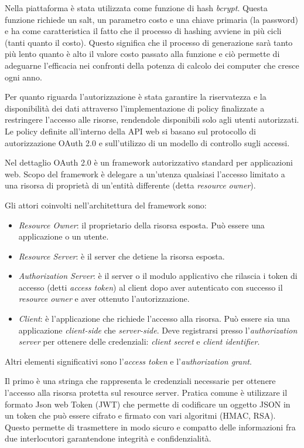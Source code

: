 Nella piattaforma è stata utilizzata come funzione di hash \textit{bcrypt}\cite{bcrypt}. Questa funzione richiede un salt, un parametro costo e una chiave primaria (la password) e ha come
caratteristica il fatto che il processo di hashing avviene in più cicli (tanti quanto il costo). Questo significa che il processo di generazione sarà tanto più lento quanto è alto il valore
costo passato alla funzione e ciò permette di adeguarne l'efficacia nei confronti della potenza di calcolo dei computer che cresce ogni anno.

Per quanto riguarda l'autorizzazione è stata garantire la riservatezza e la disponibilità dei dati
attraverso l'implementazione di policy finalizzate a restringere l'accesso alle risorse,
rendendole disponibili solo agli utenti autorizzati.
Le policy definite all'interno della API web si basano sul protocollo di autorizzazione OAuth 2.0 \cite{rfc6749} e sull'utilizzo di un
modello di controllo sugli accessi.

Nel dettaglio OAuth 2.0 è un framework autorizzativo standard per applicazioni web.
Scopo del framework è delegare a un'utenza qualsiasi l'accesso limitato a una risorsa di proprietà di un'entità differente (detta \textit{resource owner}).

Gli attori coinvolti nell'architettura del framework sono:
\begin{itemize}
    \itemsep0em
    \item \textit{Resource Owner}: il proprietario della risorsa esposta. Può essere una applicazione o un utente.
    \item \textit{Resource Server}: è il server che detiene la risorsa esposta.
    \item \textit{Authorization Server}: è il server o il modulo applicativo che rilascia i token di accesso (detti \textit{access token}) al client dopo aver
          autenticato con successo il \textit{resource owner} e aver ottenuto l'autorizzazione.
    \item  \textit{Client}: è l'applicazione che richiede l'accesso alla risorsa. Può essere sia una applicazione \textit{client-side} che \textit{server-side}.
          Deve registrarsi presso l'\textit{authorization server} per ottenere delle credenziali: \textit{client secret} e \textit{client identifier}.
\end{itemize}

Altri elementi significativi sono l'\textit{access token} e l'\textit{authorization grant}.

Il primo è una stringa che rappresenta le credenziali necessarie per ottenere l'accesso alla risorsa protetta sul resource server.
Pratica comune è utilizzare il formato Json web Token\cite{rfc7519} (JWT) che permette di codificare un oggetto JSON in un token
che può essere cifrato e firmato con vari algoritmi (HMAC, RSA). Questo permette di trasmettere in modo sicuro e compatto delle informazioni
fra due interlocutori garantendone integrità e confidenzialità.

